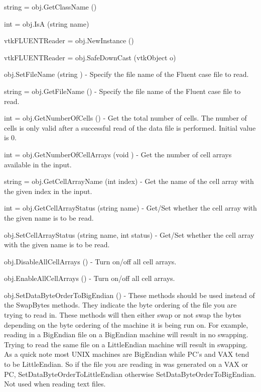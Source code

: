 \begin{DoxyItemize}
\item {\ttfamily string = obj.\-Get\-Class\-Name ()}  
\item {\ttfamily int = obj.\-Is\-A (string name)}  
\item {\ttfamily vtk\-F\-L\-U\-E\-N\-T\-Reader = obj.\-New\-Instance ()}  
\item {\ttfamily vtk\-F\-L\-U\-E\-N\-T\-Reader = obj.\-Safe\-Down\-Cast (vtk\-Object o)}  
\item {\ttfamily obj.\-Set\-File\-Name (string )} -\/ Specify the file name of the Fluent case file to read.  
\item {\ttfamily string = obj.\-Get\-File\-Name ()} -\/ Specify the file name of the Fluent case file to read.  
\item {\ttfamily int = obj.\-Get\-Number\-Of\-Cells ()} -\/ Get the total number of cells. The number of cells is only valid after a successful read of the data file is performed. Initial value is 0.  
\item {\ttfamily int = obj.\-Get\-Number\-Of\-Cell\-Arrays (void )} -\/ Get the number of cell arrays available in the input.  
\item {\ttfamily string = obj.\-Get\-Cell\-Array\-Name (int index)} -\/ Get the name of the cell array with the given index in the input.  
\item {\ttfamily int = obj.\-Get\-Cell\-Array\-Status (string name)} -\/ Get/\-Set whether the cell array with the given name is to be read.  
\item {\ttfamily obj.\-Set\-Cell\-Array\-Status (string name, int status)} -\/ Get/\-Set whether the cell array with the given name is to be read.  
\item {\ttfamily obj.\-Disable\-All\-Cell\-Arrays ()} -\/ Turn on/off all cell arrays.  
\item {\ttfamily obj.\-Enable\-All\-Cell\-Arrays ()} -\/ Turn on/off all cell arrays.  
\item {\ttfamily obj.\-Set\-Data\-Byte\-Order\-To\-Big\-Endian ()} -\/ These methods should be used instead of the Swap\-Bytes methods. They indicate the byte ordering of the file you are trying to read in. These methods will then either swap or not swap the bytes depending on the byte ordering of the machine it is being run on. For example, reading in a Big\-Endian file on a Big\-Endian machine will result in no swapping. Trying to read the same file on a Little\-Endian machine will result in swapping. As a quick note most U\-N\-I\-X machines are Big\-Endian while P\-C's and V\-A\-X tend to be Little\-Endian. So if the file you are reading in was generated on a V\-A\-X or P\-C, Set\-Data\-Byte\-Order\-To\-Little\-Endian otherwise Set\-Data\-Byte\-Order\-To\-Big\-Endian. Not used when reading text files.  

\end{DoxyItemize}
